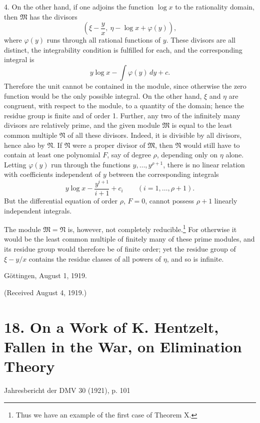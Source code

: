 \documentclass[11pt]{article}
\begin{document}
4. On the other hand, if one adjoins the function $\log x$ to the rationality domain, then $\mathfrak M$ has the divisors
\[
 \left(\xi-\frac{y}{x},\ \eta-\log x+\varphi(y)\right),
\]
where $\varphi(y)$ runs through all rational functions of $y$. These divisors are all distinct, the integrability condition is fulfilled for each, and the corresponding integral is
\[
 y\log x-\int\varphi(y)\,dy+c.
\]
Therefore the unit cannot be contained in the module, since otherwise the zero function would be the only possible integral. On the other hand, $\xi$ and $\eta$ are congruent, with respect to the module, to a quantity of the domain; hence the residue group is finite and of order 1. Further, any two of the infinitely many divisors are relatively prime, and the given module $\mathfrak M$ is equal to the least common multiple $\mathfrak N$ of all these divisors. Indeed, it is divisible by all divisors, hence also by $\mathfrak N$. If $\mathfrak N$ were a proper divisor of $\mathfrak M$, then $\mathfrak N$ would still have to contain at least one polynomial $F$, say of degree $\rho$, depending only on $\eta$ alone. Letting $\varphi(y)$ run through the functions $y,
\ldots,y^{\rho+1}$, there is no linear relation with coefficients independent of $y$ between the corresponding integrals
\[
 y\log x-\frac{y^{i+1}}{i+1}+c_i
 \qquad(i=1,
\ldots,
\rho+1).
\]
But the differential equation of order $\rho$, $F=0$, cannot possess $\rho+1$ linearly independent integrals.

The module $\mathfrak M=\mathfrak N$ is, however, not completely reducible.\footnote{Thus we have an example of the first case of Theorem X.} For otherwise it would be the least common multiple of finitely many of these prime modules, and its residue group would therefore be of finite order; yet the residue group of $\xi-y/x$ contains the residue classes of all powers of $\eta$, and so is infinite.

Göttingen, August 1, 1919.

\begin{center}
(Received August 4, 1919.)
\end{center}

\clearpage
\setcounter{footnote}{0}
\section*{18. On a Work of K. Hentzelt, Fallen in the War, on Elimination Theory}
\begin{center}
Jahresbericht der DMV 30 (1921), p. 101
\end{center}
\end{document}

